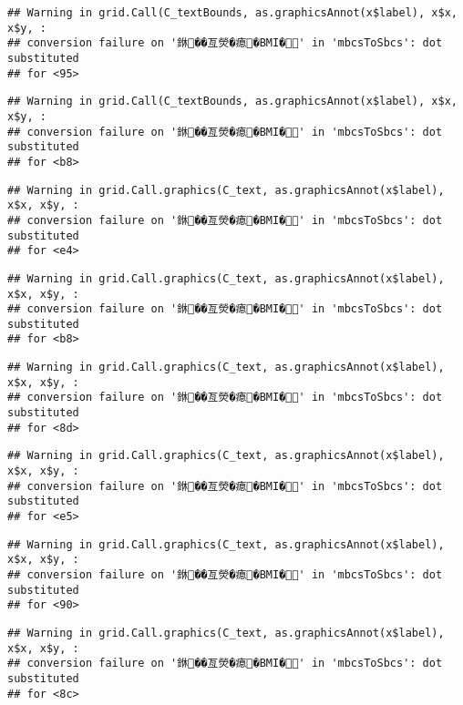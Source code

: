 \documentclass[
]{article}
\begin{document}
\begin{verbatim}
## Warning in grid.Call(C_textBounds, as.graphicsAnnot(x$label), x$x, x$y, :
## conversion failure on '銝��亙熒�瘜�BMI�' in 'mbcsToSbcs': dot substituted
## for <95>
\end{verbatim}

\begin{verbatim}
## Warning in grid.Call(C_textBounds, as.graphicsAnnot(x$label), x$x, x$y, :
## conversion failure on '銝��亙熒�瘜�BMI�' in 'mbcsToSbcs': dot substituted
## for <b8>
\end{verbatim}

\begin{verbatim}
## Warning in grid.Call.graphics(C_text, as.graphicsAnnot(x$label), x$x, x$y, :
## conversion failure on '銝��亙熒�瘜�BMI�' in 'mbcsToSbcs': dot substituted
## for <e4>
\end{verbatim}

\begin{verbatim}
## Warning in grid.Call.graphics(C_text, as.graphicsAnnot(x$label), x$x, x$y, :
## conversion failure on '銝��亙熒�瘜�BMI�' in 'mbcsToSbcs': dot substituted
## for <b8>
\end{verbatim}

\begin{verbatim}
## Warning in grid.Call.graphics(C_text, as.graphicsAnnot(x$label), x$x, x$y, :
## conversion failure on '銝��亙熒�瘜�BMI�' in 'mbcsToSbcs': dot substituted
## for <8d>
\end{verbatim}

\begin{verbatim}
## Warning in grid.Call.graphics(C_text, as.graphicsAnnot(x$label), x$x, x$y, :
## conversion failure on '銝��亙熒�瘜�BMI�' in 'mbcsToSbcs': dot substituted
## for <e5>
\end{verbatim}

\begin{verbatim}
## Warning in grid.Call.graphics(C_text, as.graphicsAnnot(x$label), x$x, x$y, :
## conversion failure on '銝��亙熒�瘜�BMI�' in 'mbcsToSbcs': dot substituted
## for <90>
\end{verbatim}

\begin{verbatim}
## Warning in grid.Call.graphics(C_text, as.graphicsAnnot(x$label), x$x, x$y, :
## conversion failure on '銝��亙熒�瘜�BMI�' in 'mbcsToSbcs': dot substituted
## for <8c>
\end{verbatim}
\end{document}
